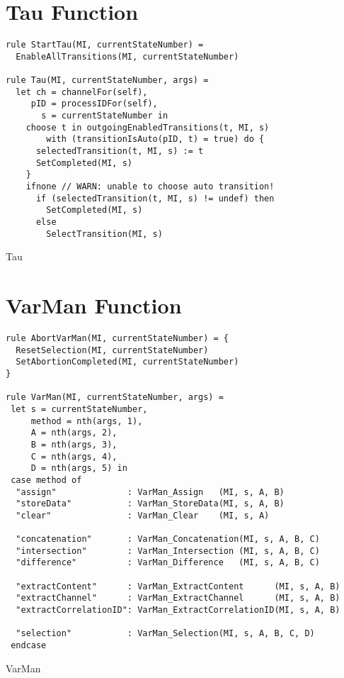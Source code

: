 \section{Tau Function}



\begin{listing}[H]
\begin{verbatim}
rule StartTau(MI, currentStateNumber) =
  EnableAllTransitions(MI, currentStateNumber)

rule Tau(MI, currentStateNumber, args) =
  let ch = channelFor(self),
     pID = processIDFor(self),
       s = currentStateNumber in
    choose t in outgoingEnabledTransitions(t, MI, s)
        with (transitionIsAuto(pID, t) = true) do {
      selectedTransition(t, MI, s) := t
      SetCompleted(MI, s)
    }
    ifnone // WARN: unable to choose auto transition!
      if (selectedTransition(t, MI, s) != undef) then
        SetCompleted(MI, s)
      else
        SelectTransition(MI, s)
\end{verbatim}
\caption{Tau}
\label{lst:asm:Tau}
\end{listing}



\section{VarMan Function}

\begin{listing}[H]
\begin{verbatim}
rule AbortVarMan(MI, currentStateNumber) = {
  ResetSelection(MI, currentStateNumber)
  SetAbortionCompleted(MI, currentStateNumber)
}

rule VarMan(MI, currentStateNumber, args) =
 let s = currentStateNumber,
     method = nth(args, 1),
     A = nth(args, 2),
     B = nth(args, 3),
     C = nth(args, 4),
     D = nth(args, 5) in
 case method of
  "assign"              : VarMan_Assign   (MI, s, A, B)
  "storeData"           : VarMan_StoreData(MI, s, A, B)
  "clear"               : VarMan_Clear    (MI, s, A)

  "concatenation"       : VarMan_Concatenation(MI, s, A, B, C)
  "intersection"        : VarMan_Intersection (MI, s, A, B, C)
  "difference"          : VarMan_Difference   (MI, s, A, B, C)

  "extractContent"      : VarMan_ExtractContent      (MI, s, A, B)
  "extractChannel"      : VarMan_ExtractChannel      (MI, s, A, B)
  "extractCorrelationID": VarMan_ExtractCorrelationID(MI, s, A, B)

  "selection"           : VarMan_Selection(MI, s, A, B, C, D)
 endcase
\end{verbatim}
\caption{VarMan}
\label{lst:asm:VarMan}
\end{listing}




